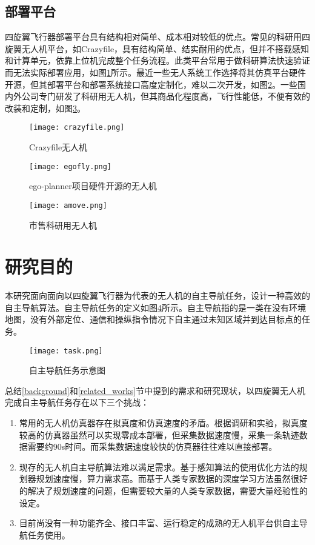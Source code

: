 \subsection{部署平台}
四旋翼飞行器部署平台具有结构相对简单、成本相对较低的优点。常见的科研用四旋翼无人机平台，如Crazyfile\cite{crazyfly}，具有结构简单、结实耐用的优点，但并不搭载感知和计算单元，依靠上位机完成整个任务流程。此类平台常用于做科研算法快速验证而无法实际部署应用，如图\ref{fig_crazyfile}所示。最近一些无人系统工作选择将其仿真平台硬件开源\cite{zhou2020ego}，但其部署平台和部署系统接口高度定制化，难以二次开发，如图\ref{fig_egofly}。一些国内外公司专门研发了科研用无人机\cite{amove}，但其商品化程度高，飞行性能低，不便有效的改装和定制，如图\ref{fig_amove}。
\begin{figure}
  \centering
    \texttt{[image: crazyfile.png]}
    \caption{Crazyfile无人机}
    \label{fig_crazyfile}
\end{figure}
\begin{figure}
  \centering
    \texttt{[image: egofly.png]}
    \caption{ego-planner项目硬件开源的无人机}
    \label{fig_egofly}
\end{figure}
\begin{figure}
  \centering
    \texttt{[image: amove.png]}
    \caption{市售科研用无人机}
    \label{fig_amove}
\end{figure}

\section{研究目的}
\label{target}
本研究面向面向以四旋翼飞行器为代表的无人机的自主导航任务，设计一种高效的自主导航算法。自主导航任务的定义如图\ref{fig_task_define}所示。自主导航指的是一类在没有环境地图，没有外部定位、通信和操纵指令情况下自主通过未知区域并到达目标点的任务。
\begin{figure}
  \centering
  \texttt{[image: task.png]}
  \caption{自主导航任务示意图}
  \label{fig_task_define}
\end{figure}

总结\ref{background}和\ref{related_works}节中提到的需求和研究现状，以四旋翼无人机完成自主导航任务存在以下三个挑战：
\begin{enumerate}
  \item 常用的无人机仿真器存在拟真度和仿真速度的矛盾。根据调研和实验，拟真度较高的仿真器虽然可以实现零成本部署，但采集数据速度慢，采集一条轨迹数据需要约90s时间\cite{loquercio2021learning}。而采集数据速度较快的仿真器往往难以直接部署\cite{zhu2022viola}。
  \item 现存的无人机自主导航算法难以满足需求。基于感知算法的使用优化方法的规划器规划速度慢，算力需求高\cite{ren2022bubble}。而基于人类专家数据的深度学习方法虽然很好的解决了规划速度的问题，但需要较大量的人类专家数据\cite{loquercio2021learning}，需要大量经验性的设定。
  \item 目前尚没有一种功能齐全、接口丰富、运行稳定的成熟的无人机平台供自主导航任务使用。
\end{enumerate}

